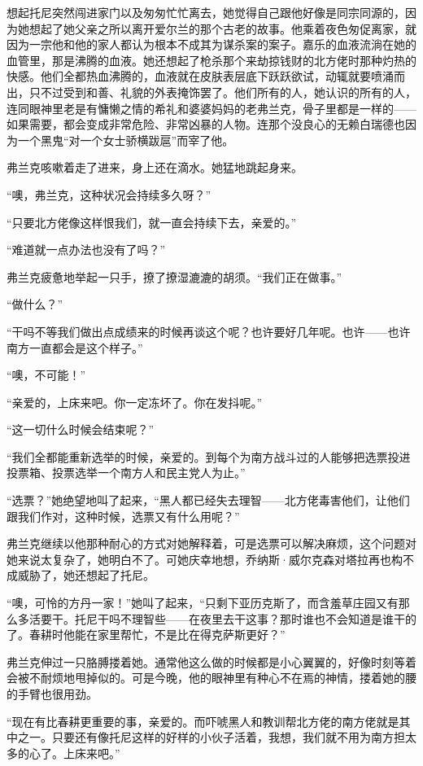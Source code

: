 \par 想起托尼突然闯进家门以及匆匆忙忙离去，她觉得自己跟他好像是同宗同源的，因为她想起了她父亲之所以离开爱尔兰的那个古老的故事。他乘着夜色匆促离家，就因为一宗他和他的家人都认为根本不成其为谋杀案的案子。嘉乐的血液流淌在她的血管里，那是沸腾的血液。她还想起了枪杀那个来劫掠钱财的北方佬时那种灼热的快感。他们全都热血沸腾的，血液就在皮肤表层底下跃跃欲试，动辄就要喷涌而出，只不过受到和善、礼貌的外表掩饰罢了。他们所有的人，她认识的所有的人，连同眼神里老是有慵懒之情的希礼和婆婆妈妈的老弗兰克，骨子里都是一样的——如果需要，都会变成非常危险、非常凶暴的人物。连那个没良心的无赖白瑞德也因为一个黑鬼“对一个女士骄横跋扈”而宰了他。
\par 弗兰克咳嗽着走了进来，身上还在滴水。她猛地跳起身来。
\par “噢，弗兰克，这种状况会持续多久呀？”
\par “只要北方佬像这样恨我们，就一直会持续下去，亲爱的。”
\par “难道就一点办法也没有了吗？”
\par 弗兰克疲惫地举起一只手，撩了撩湿漉漉的胡须。“我们正在做事。”
\par “做什么？”
\par “干吗不等我们做出点成绩来的时候再谈这个呢？也许要好几年呢。也许——也许南方一直都会是这个样子。”
\par “噢，不可能！”
\par “亲爱的，上床来吧。你一定冻坏了。你在发抖呢。”
\par “这一切什么时候会结束呢？”
\par “我们全都能重新选举的时候，亲爱的。到每个为南方战斗过的人能够把选票投进投票箱、投票选举一个南方人和民主党人为止。”
\par “选票？”她绝望地叫了起来，“黑人都已经失去理智——北方佬毒害他们，让他们跟我们作对，这种时候，选票又有什么用呢？”
\par 弗兰克继续以他那种耐心的方式对她解释着，可是选票可以解决麻烦，这个问题对她来说太复杂了，她明白不了。可她庆幸地想，乔纳斯·威尔克森对塔拉再也构不成威胁了，她还想起了托尼。
\par “噢，可怜的方丹一家！”她叫了起来，“只剩下亚历克斯了，而含羞草庄园又有那么多活要干。托尼干吗不理智些——在夜里去干这事？那时谁也不会知道是谁干的了。春耕时他能在家里帮忙，不是比在得克萨斯更好？”
\par 弗兰克伸过一只胳膊搂着她。通常他这么做的时候都是小心翼翼的，好像时刻等着会被不耐烦地甩掉似的。可是今晚，他的眼神里有种心不在焉的神情，搂着她的腰的手臂也很用劲。
\par “现在有比春耕更重要的事，亲爱的。而吓唬黑人和教训帮北方佬的南方佬就是其中之一。只要还有像托尼这样的好样的小伙子活着，我想，我们就不用为南方担太多的心了。上床来吧。”

